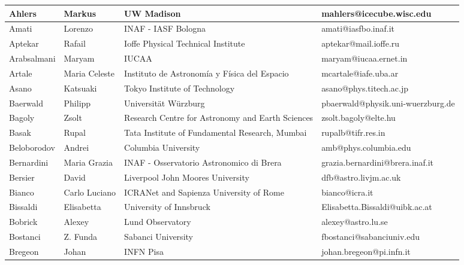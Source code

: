 \begin{center}
  \begin{longtable}{|p{1.28cm} |p{1.28cm} |p{2.9cm} |p{3cm} |}
    \hline
\tiny Ahlers &\tiny Markus & \tiny UW Madison & \tiny mahlers@icecube.wisc.edu \\ \hline
\tiny Amati &\tiny Lorenzo & \tiny INAF - IASF Bologna & \tiny amati@iasfbo.inaf.it \\ \hline
\tiny Aptekar &\tiny Rafail & \tiny Ioffe Physical Technical Institute & \tiny aptekar@mail.ioffe.ru \\ \hline
\tiny Arabsalmani &\tiny Maryam & \tiny IUCAA & \tiny maryam@iucaa.ernet.in \\ \hline
\tiny Artale &\tiny Maria Celeste & \tiny Instituto de Astronom\'ia y F\'isica del Espacio & \tiny mcartale@iafe.uba.ar \\ \hline
\tiny Asano &\tiny Katsuaki & \tiny Tokyo Institute of Technology & \tiny asano@phys.titech.ac.jp \\ \hline
\tiny Baerwald &\tiny Philipp & \tiny Universit\"at W\"urzburg & \tiny pbaerwald@physik.uni-wuerzburg.de \\ \hline
\tiny Bagoly &\tiny Zsolt & \tiny Research Centre for Astronomy and Earth Sciences & \tiny zsolt.bagoly@elte.hu \\ \hline
\tiny Basak &\tiny Rupal & \tiny Tata Institute of Fundamental Research, Mumbai & \tiny rupalb@tifr.res.in \\ \hline
\tiny Beloborodov &\tiny Andrei & \tiny Columbia University & \tiny amb@phys.columbia.edu \\ \hline
\tiny Bernardini &\tiny Maria Grazia & \tiny INAF - Osservatorio Astronomico di Brera & \tiny grazia.bernardini@brera.inaf.it \\ \hline
\tiny Bersier &\tiny David & \tiny Liverpool John Moores University & \tiny dfb@astro.livjm.ac.uk \\ \hline
\tiny Bianco &\tiny Carlo Luciano & \tiny ICRANet and Sapienza University of Rome & \tiny bianco@icra.it \\ \hline
\tiny Bissaldi &\tiny Elisabetta & \tiny University of Innsbruck & \tiny Elisabetta.Bissaldi@uibk.ac.at \\ \hline
\tiny Bobrick &\tiny Alexey & \tiny Lund Observatory & \tiny alexey@astro.lu.se \\ \hline
\tiny Bostanci &\tiny Z. Funda & \tiny Sabanci University & \tiny fbostanci@sabanciuniv.edu \\ \hline
\tiny Bregeon &\tiny Johan & \tiny INFN Pisa & \tiny johan.bregeon@pi.infn.it \\ \hline

\end{longtable}
\end{center}
